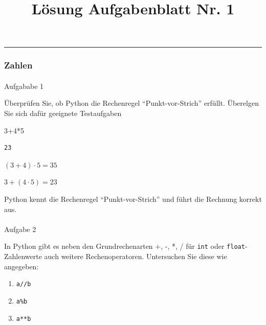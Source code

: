 \documentclass[
  11pt,
  a4paper,
  DIV=11,
  numbers=noendperiod]{scrartcl}
\title{Lösung Aufgabenblatt Nr. 1}
\author{}
\date{}
\makeatletter
\let\oldparagraph\paragraph
\renewcommand{\paragraph}{
    \@ifstar
      \xxxParagraphStar
      \xxxParagraphNoStar
  }
\newcommand{\xxxParagraphStar}[1]{\oldparagraph*{#1}\mbox{}}
\newcommand{\xxxParagraphNoStar}[1]{\oldparagraph{#1}\mbox{}}
\newenvironment{Shaded}{\begin{snugshade}}{\end{snugshade}}
\newcommand{\DecValTok}[1]{\textcolor[rgb]{0.68,0.00,0.00}{#1}}
\newcommand{\OperatorTok}[1]{\textcolor[rgb]{0.37,0.37,0.37}{#1}}
\makeatother
\begin{document}
\maketitle


\begin{center}\rule{0.5\linewidth}{0.5pt}\end{center}

\subsubsection{Zahlen}\label{zahlen}

\paragraph{Aufgababe 1}\label{aufgababe-1}

Überprüfen Sie, ob Python die Rechenregel ``Punkt-vor-Strich'' erfüllt.
Überelgen Sie sich dafür geeignete Testaufgaben

\begin{Shaded}
\begin{Highlighting}[numbers=left,,]
\DecValTok{3}\OperatorTok{+}\DecValTok{4}\OperatorTok{*}\DecValTok{5}
\end{Highlighting}
\end{Shaded}

\begin{verbatim}
23
\end{verbatim}

\((3+4)\cdot 5= 35\)

\(3+(4\cdot 5)= 23\)

Python kennt die Rechenregel ``Punkt-vor-Strich'' und führt die Rechnung
korrekt aus.

\paragraph{Aufgabe 2}\label{aufgabe-2}

In Python gibt es neben den Grundrechenarten +, -, *, / für \texttt{int}
oder \texttt{float}-Zahlenwerte auch weitere Rechenoperatoren.
Untersuchen Sie diese wie angegeben:

\begin{enumerate}
\def\labelenumi{\alph{enumi})}
\item
  \texttt{a//b}
\item
  \texttt{a\%b}
\item
  \texttt{a**b}
\end{enumerate}
\end{document}
